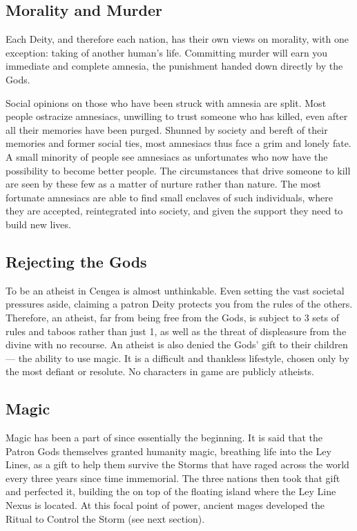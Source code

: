 \documentclass[blue]{GL2020}
\begin{document}
\subsection*{Morality and Murder}
Each Deity, and therefore each nation, has their own views on morality, with one exception: taking of another human's life. Committing murder will earn you immediate and complete amnesia, the punishment handed down directly by the Gods.

Social opinions on those who have been struck with amnesia are split. Most people ostracize amnesiacs, unwilling to trust someone who has killed, even after all their memories have been purged. Shunned by society and bereft of their memories and former social ties, most amnesiacs thus face a grim and lonely fate. A small minority of people see amnesiacs as unfortunates who now have the possibility to become better people. The circumstances that drive someone to kill are seen by these few as a matter of nurture rather than nature. The most fortunate amnesiacs are able to find small enclaves of such individuals, where they are accepted, reintegrated into society, and given the support they need to build new lives.

\subsection*{Rejecting the Gods}
To be an atheist in Cengea is almost unthinkable. Even setting the vast societal pressures aside, claiming a patron Deity protects you from the rules of the others. Therefore, an atheist, far from being free from the Gods, is subject to 3 sets of rules and taboos rather than just 1, as well as the threat of displeasure from the divine with no recourse. An atheist is also denied the Gods' gift to their children — the ability to use magic. It is a difficult and thankless lifestyle, chosen only by the most defiant or resolute. No characters in game are publicly atheists.

\subsection*{Magic}
Magic has been a part of \pEarth{} since essentially the beginning. It is said that the Patron Gods themselves granted humanity magic, breathing life into the Ley Lines, as a gift to help them survive the Storms that have raged across the world every three years since time immemorial. The three nations then took that gift and perfected it, building the \pSchool{} on top of the floating island where the Ley Line Nexus is located. At this focal point of power, ancient mages developed the Ritual to Control the Storm (see next section).
\end{document}
